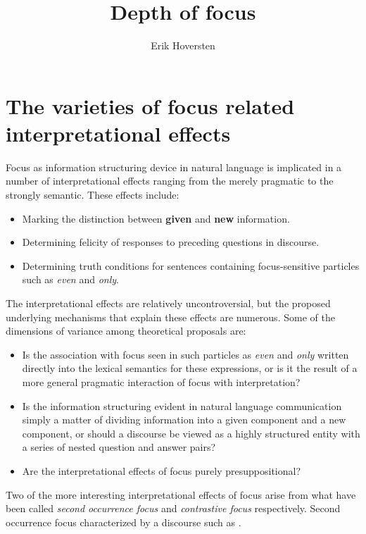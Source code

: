 \documentclass[10pt]{article}
\title{Depth of focus}
\author{Erik Hoversten}
\begin{document}
\maketitle

\section{The varieties of focus related interpretational effects}

Focus as information structuring device in natural language is implicated in a number of interpretational effects ranging from the merely pragmatic to the strongly semantic.  These effects include:

\begin{itemize}
 \item Marking the distinction between \textbf{given} and \textbf{new} information.
 \item Determining felicity of responses to preceding questions in discourse.
 \item Determining truth conditions for sentences containing focus-sensitive particles such as \textit{even} and \textit{only}.
\end{itemize}

The interpretational effects are relatively uncontroversial, but the proposed underlying mechanisms that explain these effects are numerous.  Some of the dimensions of variance among theoretical proposals are:
\begin{itemize}
 \item Is the association with focus seen in such particles as \textit{even} and \textit{only} written directly into the lexical semantics for these expressions, or is it the result of a more general pragmatic interaction of focus with interpretation?
 \item Is the information structuring evident in natural language communication simply a matter of dividing information into a given component and a new component, or should a discourse be viewed as a highly structured entity with a series of nested question and answer pairs?
 \item Are the interpretational effects of focus purely presuppositional?
\end{itemize}

Two of the more interesting interpretational effects of focus arise from what have been called \textit{second occurrence focus} and \textit{contrastive focus} respectively.  Second occurrence focus characterized by a discourse such as \Next.
\end{document}
